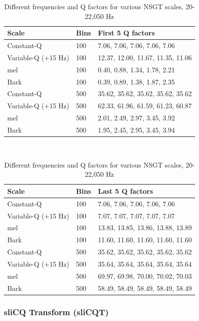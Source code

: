\documentclass[report.tex]{subfiles}
\begin{document}
\begin{table}[ht]
\begin{tabular}{ |l|l|p{9cm}| }
	 \hline
	 Scale & Bins & First 5 Q factors \\
	 \hline
	 \hline
	 Constant-Q & 100 & 7.06, 7.06, 7.06, 7.06, 7.06  \\
	 \hline
	 Variable-Q (+15 Hz) & 100 & 12.37, 12.00, 11.67, 11.35, 11.06 \\
	 \hline
	 mel & 100 & 0.40, 0.88, 1.34, 1.78, 2.21 \\
	 \hline
	 Bark & 100 & 0.39, 0.89, 1.38, 1.87, 2.35 \\
	 \hline
	 Constant-Q & 500 & 35.62, 35.62, 35.62, 35.62, 35.62 \\
	 \hline
	 Variable-Q (+15 Hz) & 500 & 62.33, 61.96, 61.59, 61.23, 60.87 \\
	 \hline
	 mel & 500 & 2.01, 2.49, 2.97, 3.45, 3.92 \\
	 \hline
	 Bark & 500 & 1.95, 2.45, 2.95, 3.45, 3.94 \\
	 \hline
\end{tabular}\\
\vspace{1em}
\begin{tabular}{ |l|l|p{9cm}| }
	 \hline
	 Scale & Bins & Last 5 Q factors \\
	 \hline
	 \hline
	 Constant-Q & 100 & 7.06, 7.06, 7.06, 7.06, 7.06  \\
	 \hline
	 Variable-Q (+15 Hz) & 100 & 7.07, 7.07, 7.07, 7.07, 7.07 \\
	 \hline
	 mel & 100 & 13.83, 13.85, 13.86, 13.88, 13.89 \\
	 \hline
	 Bark & 100 & 11.60, 11.60, 11.60, 11.60, 11.60 \\
	 \hline
	 Constant-Q & 500 & 35.62, 35.62, 35.62, 35.62, 35.62 \\
	 \hline
	 Variable-Q (+15 Hz) & 500 & 35.64, 35.64, 35.64, 35.64, 35.64 \\
	 \hline
	 mel & 500 & 69.97, 69.98, 70.00, 70.02, 70.03 \\
	 \hline
	 Bark & 500 & 58.49, 58.49, 58.49, 58.49, 58.49 \\
	 \hline
\end{tabular}
	\caption{Different frequencies and Q factors for various NSGT scales, 20-22,050 Hz}
	\label{table:nsgtfreqsandqs}
\end{table}

\newpagefill

\subsubsection{sliCQ Transform (sliCQT)}
\label{sec:theoryslicqt}
\end{document}
